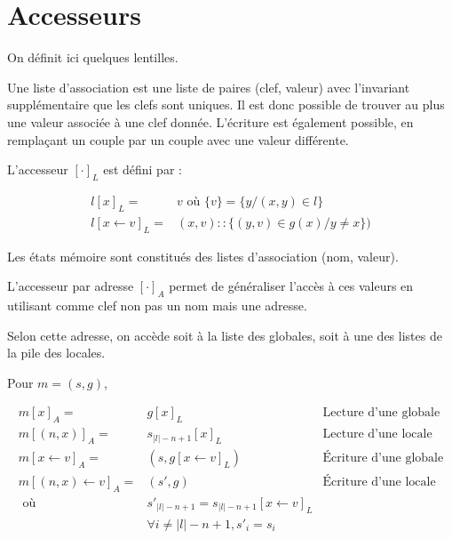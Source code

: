 \section{Accesseurs}

On définit ici quelques lentilles.

\begin{definition}

  Une liste d'association est une liste de paires (clef, valeur) avec
  l'invariant supplémentaire que les clefs sont uniques. Il est donc possible de
  trouver au plus une valeur associée à une clef donnée. L'écriture est
  également possible, en remplaçant un couple par un couple avec une valeur
  différente.

  L'accesseur $[\cdot]_L$ est défini par :

  \begin{align*}
    l[x]_L     = & v \mbox{ où } \{v\} = \{y / (x, y) ∈ l\} \\
    l[x ← v]_L = & (x, v) :: \{ (y, v) ∈ g(x) / y ≠ x \})
  \end{align*}

\end{definition}

\begin{definition}

  Les états mémoire sont constitués des listes d'association (nom, valeur).

  L'accesseur par adresse $[\cdot]_A$ permet de généraliser l'accès à ces
  valeurs en utilisant comme clef non pas un nom mais une adresse.

  Selon cette adresse, on accède soit à la liste des globales, soit à une des
  listes de la pile des locales.

  Pour $m = (s, g)$,

  \begin{align*}
    m [x]_A          = & g[x]_L           & \textrm{Lecture d'une globale} \\
    m [(n, x)]_A     = & s_{|l|-n+1}[x]_L & \textrm{Lecture d'une locale} \\
    m [x ← v]_A      = & (s, g[x←v]_L)    & \textrm{Écriture d'une globale} \\
    m [(n, x) ← v]_A = & (s', g)          & \textrm{Écriture d'une locale} \\
           \mbox{ où } & s'_{|l|-n+1} = s_{|l|-n+1}[x ← v]_L \\
                       & ∀ i ≠ |l|-n+1, s'_i = s_i
  \end{align*}

\end{definition}

